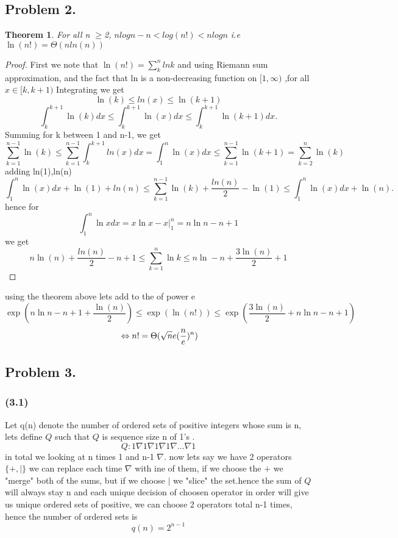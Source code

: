 \documentclass[12pt]{article}
\newtheorem*{theorem*}{Theorem}
\begin{document}
\subsection*{Problem 2.}
\begin{theorem*}
For all n $\geq$2, $nlogn-n<log(n!)<nlogn$
i.e $\ln(n!)=\Theta (nln(n))$

\end{theorem*}
\begin{proof}
First we note that $\ln(n!)=\sum ^n_klnk$ and using Riemann sum approximation, and the fact that ln is a non-decreasing function on $[1,\infty )$ ,for all $x\in [k,k+1)$ Integrating we get
\[
\ln(k) \leq ln(x) \leq \ln(k+1)
\]
\[
 \int_k^{k+1} \ln(k) dx \leq \int_k^{k+1} \ln(x) dx \leq \int_k^{k+1} \ln(k+1) dx .
\]
Summing for k between 1 and n-1, we get
\[
\sum_{k=1}^{n-1} \ln(k) \leq \sum_{k=1}^{n-1} \int_k^{k+1} ln(x) dx = \int_1^{n} \ln(x) dx \leq \sum_{k=1}^{n-1} \ln(k+1) = \sum_{k=2}^{n} \ln(k)
\] 
adding ln(1),ln(n)\[
\int_1^{n} \ln(x) dx  + \ln(1)+ln(n) \leq \sum_{k=1}^{n-1} \ln(k) +\dfrac{ln(n)}{2}-\ln(1) \leq \int_1^{n} \ln(x) dx + \ln(n).
\] 
hence for
\[
\int_1^{n} \ln x dx = x\ln x -x|^n_1 = n\ln n - n +1
\]
we get
\[
n\ln(n) +\dfrac{ln(n)}{2} - n + 1 \leq \sum_{k=1}^{n} \ln k \leq n\ln -n +  \dfrac{3\ln(n)}{2} +  1 
\]
\end{proof}
using the theorem above lets add to the of power e
\[\exp(n\ln n - n + 1+\dfrac{\ln(n)}{2}) \leq \exp(\ln(n!))\leq \exp(\dfrac{3\ln(n)}{2}+n\ln n - n  +  1)
\]
\[
\\
\Leftrightarrow  n!=\Theta(\sqrt{n}e(\frac{n}{e})^n)
\]
\subsection*{Problem 3.}
\subsubsection*{(3.1)} Let q(n) denote the number of ordered sets of positive integers whose sum is n, lets define $Q$ such that $Q$ is  sequence size n of 1's .
\[
Q: {1\nabla 1\nabla1\nabla1 \nabla \dots \nabla   1}
\]
in total we looking at n times 1 and n-1 $\nabla$. now lets say we have 2 operators 
$\lbrace + , |\rbrace$ we can replace each time $\nabla$ with ine of them, if we choose the $+$ we "merge" both of the sums, but if we choose $|$ we "slice" the set.hence the sum of $Q$ will always stay n
and each unique  decision of choosen operator in order will give us unique  ordered sets of positive, we can choose 2 operators total n-1 times, hence the number of ordered sets is 
\[
q(n)=2^{n-1}
\]
\end{document}
